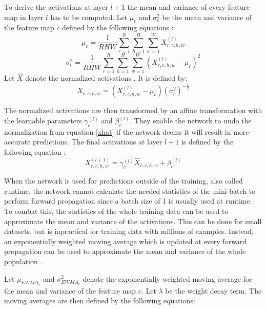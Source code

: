 \documentclass[a4paper, twoside]{article}
\begin{document}
To derive the activations at layer $l+1$ the mean and variance of every feature map in layer $l$ has to be computed. Let $\mu_c$ and $\sigma^2_c$ be the mean and variance of the feature map $c$ defined by the following equations \cite{cs231n} \cite{batchnorm}: 
\begin{equation}\label{eqmuc}
\mu_c = \frac{1}{RHW} \sum^{R }_{r=1} \sum^{H }_{h=1} \sum^{W }_{w=1} X^{(l)}_{r,c,h,w}
\end{equation}
\begin{equation}\label{eqsigmac}
\sigma^2_c  = \frac{1}{RHW} \sum^{R }_{r=1} \sum^{H }_{h=1} \sum^{W }_{w=1} ({X^{(l)}_{r,c,h,w} - \mu_c})^2
\end{equation}
Let $\hat{X}$ denote the normalized activations \cite{cs231n} \cite{batchnorm}. It is defined by:
\begin{equation}\label{xhat}
\hat{X}_{r,c,h,w} = (X^{(l)}_{r,c,h,w} - \mu_c){(\sigma^2_c)}^{-\frac{1}{2}}
\end{equation}

The normalized activations are then transformed by an affine transformation with the learnable parameters $\gamma_{c}^{(l)}$ and $\beta_{c}^{(l)}$. They enable the network to undo the normalization from equation \eqref{xhat} if the network deems it will result in more accurate predictions. The final activations at layer $l+1$ is defined by the following equation \cite{cs231n} \cite{batchnorm}:
\begin{equation}\label{eqbn}
X^{(l+1)}_{r,c,h,w} = \gamma_{c}^{(l)} \hat{X}_{r,c,h,w} + \beta_{c}^{(l)}
\end{equation}

When the network is used for predictions outside of the training, also called runtime, the network cannot calculate the needed statistics of the mini-batch to perform forward propagation since a batch size of 1 is usually used at runtime. To combat this, the statistics of the whole training data can be used to approximate the mean and variance of the activations. This can be done for small datasets, but is inpractical for training data with millions of examples. Instead, an exponentially weighted moving average which is updated at every forward propagation can be used to approximate the mean and variance of the whole population \cite{cs231n} \cite{batchnorm}. 

Let $\mu_{EWMA_c}$ and $\sigma^2_{EWMA_c}$ denote the exponentially weighted moving average for the mean and variance of the feature map $c$. Let $\lambda$ be the weight decay term. The moving averages are then defined by the following equations:
\end{document}
